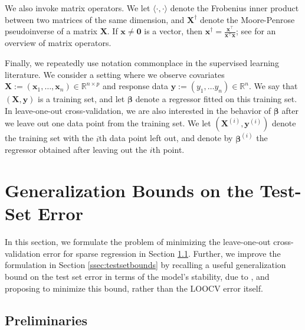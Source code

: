 \documentclass[opre,nonblindrev]{informs3} %
\begin{document}
We also invoke matrix operators. We let $\langle \cdot,\cdot \rangle$ denote the Frobenius inner product between two matrices of the same dimension, and $\bm{X}^\dag$ denote the Moore-Penrose pseudoinverse of a matrix $\bm{X}$. If $\bm{x} \neq \bm{0}$ is a vector, then $\bm{x}^\dag=\frac{\bm{x}^\top}{\bm{x}^\top \bm{x}}$; see \citet{johnson1985matrix} for an overview of matrix operators. 

Finally, we repeatedly use notation commonplace in the supervised learning literature. We consider a setting where we observe covariates $\bm{X}:=(\bm{x}_1, \ldots, \bm{x}_n) \in \mathbb{R}^{n \times p}$ and response data $\bm{y}:=(y_1, \ldots y_n) \in \mathbb{R}^n$. %
We say that $(\bm{X}, \bm{y})$ is a training set, and let $\bm{\beta}$ denote a regressor fitted on this training set. In leave-one-out cross-validation, we are also interested in the behavior of $\bm{\beta}$ after we leave out one data point from the training set. We let $(\bm{X}^{(i)}, \bm{y}^{(i)})$ denote the training set with the $i$th data point left out, and denote by $\bm{\beta}^{(i)}$ the regressor obtained after leaving out the $i$th point. 



\section{Generalization Bounds on the Test-Set Error}\label{subsec:lowerbounds}
In this section, we formulate the problem of minimizing the leave-one-out cross-validation error for sparse regression in Section \ref{ssec:prelim}. Further, we improve the formulation in Section \ref{ssec:testsetbounds} by recalling a useful generalization bound on the test set error in terms of the model's stability, due to \cite{bousquet2002stability}, and proposing to minimize this bound, rather than the LOOCV error itself. 

\subsection{Preliminaries}\label{ssec:prelim}
\end{document}
